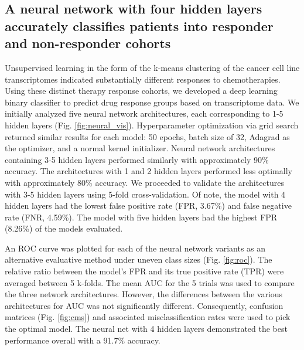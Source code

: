 \documentclass[10pt, letterpaper]{article}
\begin{document}
\begin{multicols*}{2}
\subsection*{A neural network with four hidden layers accurately classifies patients into responder and non-responder cohorts}
Unsupervised learning in the form of the k-means clustering of the cancer cell line transcriptomes indicated substantially different responses to chemotherapies. Using these distinct therapy response cohorts, we developed a deep learning binary classifier to predict drug response groups based on transcriptome data. We initially analyzed five neural network architectures, each corresponding to 1-5 hidden layers (Fig. \ref{fig:neural_vis}). Hyperparameter optimization via grid search returned similar results for each model: 50 epochs, batch size of 32, Adagrad as the optimizer, and a normal kernel initializer. Neural network architectures containing 3-5 hidden layers performed similarly with approximately 90\% accuracy. The architectures with 1 and 2 hidden layers performed less optimally with approximately 80\% accuracy. We proceeded to validate the architectures with 3-5 hidden layers using 5-fold cross-validation. Of note, the model with 4 hidden layers had the lowest false positive rate (FPR, 3.67\%) and false negative rate (FNR, 4.59\%). The model with five hidden layers had the highest FPR (8.26\%) of the models evaluated.

An ROC curve was plotted for each of the neural network variants as an alternative evaluative method under uneven class sizes (Fig. \ref{fig:roc}). The relative ratio between the model’s FPR and its true positive rate (TPR) were averaged between 5 k-folds. The mean AUC for the 5 trials was used to compare the three network architectures. However, the differences between the various architectures for AUC was not significantly different. Consequently, confusion matrices (Fig. \ref{fig:cms}) and associated misclassification rates were used to pick the optimal model. The neural net with 4 hidden layers demonstrated the best performance overall with a 91.7\% accuracy.



\end{multicols*}
\end{document}

